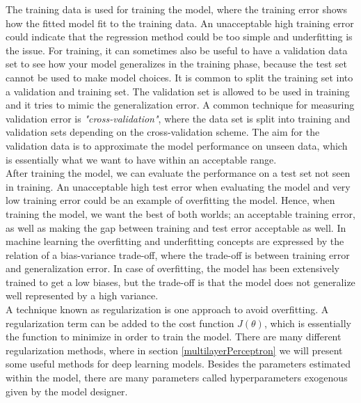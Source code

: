 The training data is used for training the model, where the training error shows how the fitted model fit to the training data. An unacceptable high training error could indicate that the regression method could be too simple and underfitting is the issue. For training, it can sometimes also be useful to have a validation data set to see how your model generalizes in the training phase, because the test set cannot be used to make model choices. It is common to split the training set into a validation and training set. The validation set is allowed to be used in training and it tries to mimic the generalization error. A common technique for measuring validation error is \textsl{"cross-validation"}, where the data set is split into training and validation sets depending on the cross-validation scheme. The aim for the validation data is to approximate the model performance on unseen data, which is essentially what we want to have within an acceptable range.\\

After training the model, we can evaluate the performance on a test set not seen in training. An unacceptable high test error when evaluating the model and very low training error could be an example of overfitting the model. Hence, when training the model, we want the best of both worlds; an acceptable training error, as well as making the gap between training and test error acceptable as well. In machine learning the overfitting and underfitting concepts are expressed by the relation of a bias-variance trade-off, where the trade-off is between training error and generalization error. In case of overfitting, the model has been extensively trained to get a low biases, but the trade-off is that the model does not generalize well represented by a high variance.\\

A technique known as regularization is one approach to avoid overfitting. A regularization term can be added to the cost function $J(\theta)$, which is essentially the function to minimize in order to train the model. There are many different regularization methods, where in section \ref{multilayerPerceptron} we will present some useful methods for deep learning models. Besides the parameters estimated within the model, there are many parameters called hyperparameters exogenous given by the model designer.\\

